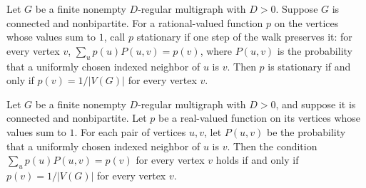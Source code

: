 \begin{theorem}
\label{Randomized.RegularMultigraph.isStationary_iff_eq_uniform}
\leanok
{}
Let $G$ be a finite nonempty $D$-regular multigraph with $D>0$. Suppose $G$ is connected
and nonbipartite. For a rational-valued function $p$ on the vertices whose values sum to
$1$, call $p$ stationary if one step of the walk preserves it: for every vertex $v$,
$\sum_u p(u)P(u,v)=p(v)$, where $P(u,v)$ is the probability that a uniformly chosen
indexed neighbor of $u$ is $v$. Then $p$ is stationary if and only if $p(v)=1/|V(G)|$
for every vertex $v$.
\end{theorem}

\begin{theorem}
\label{Randomized.RegularMultigraph.isStationary_real_iff_eq_uniform}
\leanok
{}
Let $G$ be a finite nonempty $D$-regular multigraph with $D>0$, and suppose it is
connected and nonbipartite. Let $p$ be a real-valued function on its vertices whose
values sum to $1$. For each pair of vertices $u,v$, let $P(u,v)$ be the probability that
a uniformly chosen indexed neighbor of $u$ is $v$. Then the condition $\sum_u
p(u)P(u,v)=p(v)$ for every vertex $v$ holds if and only if $p(v)=1/|V(G)|$ for every
vertex $v$.
\end{theorem}

